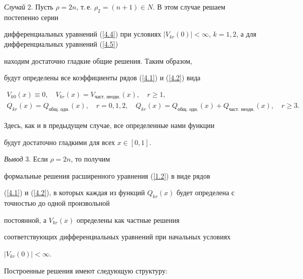 {\it Случай} 2. Пусть $\rho = 2n$, т.\,е. $\rho_2


= (n + 1)\in N$. В этом случае решаем постепенно серии


дифференциальных уравнений (\ref{4.4}) при условиях $|V_{kr}


(0)|<\infty$, $k = 1,2$, а для дифференциальных уравнений (\ref{4.5})


находим достаточно гладкие общие решения. Таким образом, 


будут определены все коэффициенты рядов (\ref{4.1}) и (\ref{4.2}) вида 


\begin{gather*}


V_{k0} (x) \equiv 0, \quad V_{kr} (x) = V_{\text{част. неодн.}} (x),


\quad r\geq 1,\\


%


Q_{kr} (x) = Q_{\text{общ. одн.}} (x), \quad r = 0,1,2,


\quad Q_{kr} (x) = Q_{\text{общ. одн.}} (x) +


Q_{\text{част. неодн.}} (x), \quad r\geq 3.


\end{gather*}


Здесь, как и в предыдущем случае, все определенные нами функции


будут достаточно гладкими для всех $x \in [0,1]$.


\medskip





{\it Вывод} 3. Если $\rho = 2n $, то получим


формальные решения расширенного уравнения (\ref{1.2}) в виде рядов


(\ref{4.1}) и (\ref{4.2}), в которых каждая из функций $ Q_{kr}


(x)$ будет определена с точностью до одной произвольной


постоянной, а $ V_{kr} (x)$ определены как частные решения


соответствующих дифференциальных уравнений при начальных условиях


$|V_{kr} (0)|< \infty$.


\medskip





Построенные решения имеют следующую структуру:


